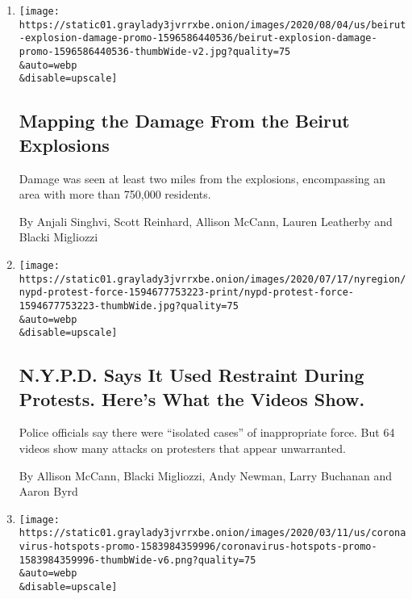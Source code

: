\begin{enumerate}
\def\labelenumi{\arabic{enumi}.}
\item
  \href{/interactive/2020/08/04/world/middleeast/beirut-explosion-damage.html}{}

  \texttt{[image: https://static01.graylady3jvrrxbe.onion/images/2020/08/04/us/beirut-explosion-damage-promo-1596586440536/beirut-explosion-damage-promo-1596586440536-thumbWide-v2.jpg?quality=75\\\&auto=webp\\\&disable=upscale]}

  \hypertarget{mapping-the-damage-from-the-beirut-explosions}{%
  \subsection{Mapping the Damage From the Beirut
  Explosions}\label{mapping-the-damage-from-the-beirut-explosions}}

  Damage was seen at least two miles from the explosions, encompassing
  an area with more than 750,000 residents.

  By Anjali Singhvi, Scott Reinhard, Allison McCann, Lauren Leatherby
  and Blacki Migliozzi
\item
  \href{/interactive/2020/07/14/nyregion/nypd-george-floyd-protests.html}{}

  \texttt{[image: https://static01.graylady3jvrrxbe.onion/images/2020/07/17/nyregion/nypd-protest-force-1594677753223-print/nypd-protest-force-1594677753223-thumbWide.jpg?quality=75\\\&auto=webp\\\&disable=upscale]}

  \hypertarget{nypd-says-it-used-restraint-during-protests-heres-what-the-videos-show}{%
  \subsection{N.Y.P.D. Says It Used Restraint During Protests. Here's
  What the Videos
  Show.}\label{nypd-says-it-used-restraint-during-protests-heres-what-the-videos-show}}

  Police officials say there were ``isolated cases'' of inappropriate
  force. But 64 videos show many attacks on protesters that appear
  unwarranted.

  By Allison McCann, Blacki Migliozzi, Andy Newman, Larry Buchanan and
  Aaron Byrd
\item
  \href{/interactive/2020/world/coronavirus-maps-italy-iran-korea.html}{}

  \texttt{[image: https://static01.graylady3jvrrxbe.onion/images/2020/03/11/us/coronavirus-hotspots-promo-1583984359996/coronavirus-hotspots-promo-1583984359996-thumbWide-v6.png?quality=75\\\&auto=webp\\\&disable=upscale]}


\end{enumerate}
